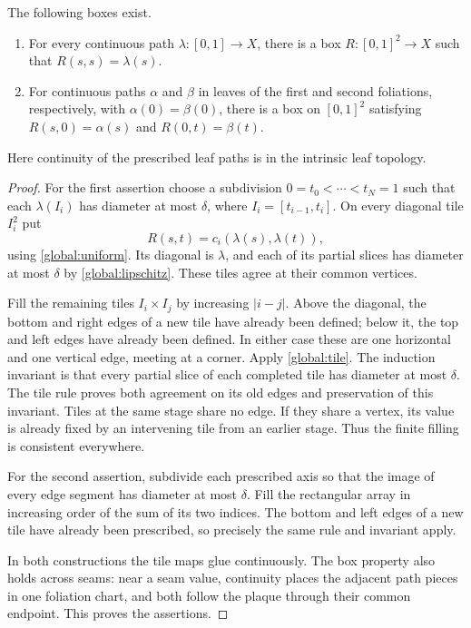 \begin{lemma}\label{global:boxes}
The following boxes exist.
\begin{enumerate}
 \item For every continuous path $\lambda\colon[0,1]\to X$, there is a
 box $R\colon[0,1]^2\to X$ such that $R(s,s)=\lambda(s)$.
 \item For continuous paths $\alpha$ and $\beta$ in leaves of the first
 and second foliations, respectively, with
 $\alpha(0)=\beta(0)$, there is a box on $[0,1]^2$ satisfying
 $R(s,0)=\alpha(s)$ and $R(0,t)=\beta(t)$.
\end{enumerate}
Here continuity of the prescribed leaf paths is in the intrinsic leaf
topology.
\end{lemma}

\begin{proof}
For the first assertion choose a subdivision
$0=t_0<\cdots<t_N=1$ such that each $\lambda(I_i)$ has diameter at most
$\delta$, where $I_i=[t_{i-1},t_i]$.  On every diagonal tile $I_i^2$ put
\[
 R(s,t)=c_i(\lambda(s),\lambda(t)),
\]
using \eqref{global:uniform}.  Its diagonal is $\lambda$, and each of
its partial slices has diameter at most $\delta$ by
\eqref{global:lipschitz}.  These tiles agree at their common vertices.

Fill the remaining tiles $I_i\times I_j$ by increasing $|i-j|$.
Above the diagonal, the bottom and right edges of a new tile have
already been defined; below it, the top and left edges have already
been defined.  In either case these are one horizontal and one vertical
edge, meeting at a corner.  Apply \eqref{global:tile}.
The induction invariant is that every partial slice of each completed
tile has diameter at most $\delta$.  The tile rule proves both agreement
on its old edges and preservation of this invariant.  Tiles at the same
stage share no edge.  If they share a vertex, its value is already fixed
by an intervening tile from an earlier stage.  Thus the finite filling
is consistent everywhere.

For the second assertion, subdivide each prescribed axis so that the
image of every edge segment has diameter at most $\delta$.  Fill the
rectangular array in increasing order of the sum of its two indices.
The bottom and left edges of a new tile have already been prescribed,
so precisely the same rule and invariant apply.

In both constructions the tile maps glue continuously.  The box
property also holds across seams: near a seam value, continuity places
the adjacent path pieces in one foliation chart, and both follow the
plaque through their common endpoint.  This proves the assertions.
\end{proof}

